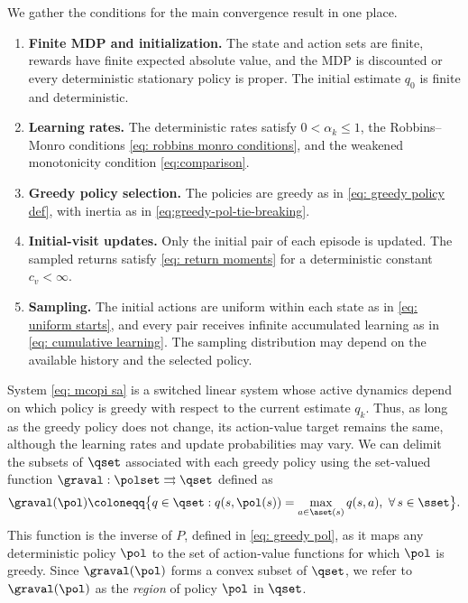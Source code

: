 We gather the conditions for the main convergence result in one place.

\begin{assumption}
\label{asp: standing}
\phantom{Assume}
\begin{enumerate}[label=(\arabic*)]
\item \textbf{Finite MDP and initialization.} The state and action sets are finite, rewards have finite expected absolute value, and the MDP is discounted or every deterministic stationary policy is proper. The initial estimate $q_0$ is finite and deterministic.
\item \textbf{Learning rates.} The deterministic rates satisfy $0<\alpha_k\le1$, the Robbins--Monro conditions \eqref{eq: robbins monro conditions}, and the weakened monotonicity condition \eqref{eq:comparison}.
\item \textbf{Greedy policy selection.} The policies are greedy as in \eqref{eq: greedy policy def}, with inertia as in \eqref{eq:greedy-pol-tie-breaking}.
\item \textbf{Initial-visit updates.} Only the initial pair of each episode is updated. The sampled returns satisfy \eqref{eq: return moments} for a deterministic constant $c_v<\infty$.
\item \textbf{Sampling.} The initial actions are uniform within each state as in \eqref{eq: uniform starts}, and every pair receives infinite accumulated learning as in \eqref{eq: cumulative learning}. The sampling distribution may depend on the available history and the selected policy.
\end{enumerate}
\end{assumption}

System \eqref{eq: mcopi sa} is a switched linear system whose active dynamics depend on which policy is greedy with respect to the current estimate $q_k$.
Thus, as long as the greedy policy does not change, its action-value target remains the same, although the learning rates and update probabilities may vary.
We can delimit the subsets of $\qset$ associated with each greedy policy using the set-valued function $\graval : \polset \rightrightarrows \qset$ defined as
\begin{align}
\label{eq: greedy action values}
    \graval(\pol) \coloneqq \big\{ q \in \qset : q(s, \pol(s)) = \max_{a \in \aset(s)} q(s,a), \ \forall \, s \in \sset \big\} .
\end{align}
This function is the inverse of $P$, defined in \eqref{eq: greedy pol}, as it maps any deterministic policy $\pol$ to the set of action-value functions for which $\pol$ is greedy.
Since $\graval(\pol)$ forms a convex subset of $\qset$, we refer to $\graval(\pol)$ as the \textit{region} of policy $\pol$ in $\qset$.

